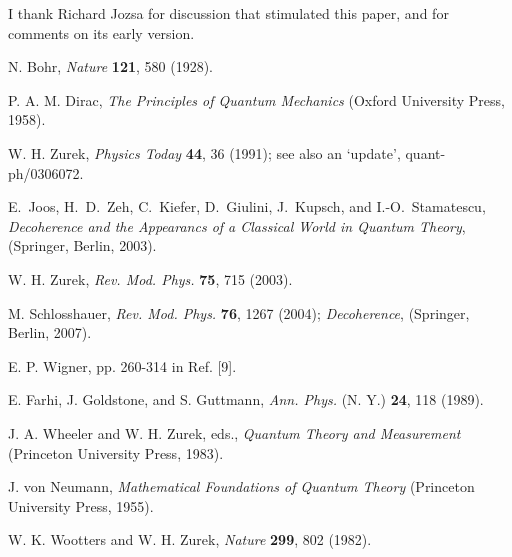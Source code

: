 \documentclass[aps,twocolumn,pra,onecolumn,12pt]{revtex4}
\newcommand{\+}         {\dagger}
\newcommand\hocom[1]{}%
\begin{document}
\hocom{Same ``indecision'' is true in quantum phase transitions. There, only broken symmetry states are 
in evidence, and detection of their symmetric superposition is all but impossible when a large number
of subsystems is involved: Only a global measurement on all microscopic subsystems could reveal 
the phase between the two obvious alternatives in the case of quantum Ising. By the same token, 
only global measurements of the whole environment can exhibit coherence between branches 
defined by redundant imprinting of information in quantum Darwinism. We have signaled some of 
the analogies that arise, but investigating them in detail is beyond the scope of this paper. }

I thank Richard Jozsa for discussion that stimulated this paper, and for
comments on its early version.

\smallskip


\smallskip

\noindent [1] N. Bohr, {\it Nature} {\bf 121}, 580 (1928).

\noindent [2] P. A. M. Dirac, {\it The Principles of Quantum Mechanics} (Oxford University Press, 1958).

\noindent [3] W. H. Zurek, {\it Physics Today} {\bf 44}, 36 (1991); see also
an `update', quant-ph/0306072.

\noindent [4] E.~Joos, H.~D.~Zeh, C.~Kiefer, D.~Giulini, J.~Kupsch, and 
I.-O.~Stamatescu, {\it Decoherence and the Appearancs of 
a Classical World in Quantum Theory}, (Springer, Berlin, 2003).

\noindent [5] W. H. Zurek, {\it Rev. Mod. Phys.} {\bf 75}, 715 (2003).

\noindent [6] M. Schlosshauer, {\it Rev. Mod. Phys.} {\bf 76}, 1267 (2004); {\it Decoherence}, 
(Springer, Berlin, 2007).

\noindent [7] E. P. Wigner, pp. 260-314 in Ref. [9].

\noindent [8] E. Farhi, J. Goldstone, and S. Guttmann, {\it Ann. Phys.} (N. Y.) {\bf 24}, 118 (1989).

\noindent [9] J. A. Wheeler and W. H. Zurek, eds., {\it Quantum Theory and
Measurement} (Princeton University Press, 1983).

\noindent [10] J. von Neumann, {\it Mathematical Foundations of Quantum Theory} (Princeton University Press, 1955).

\noindent [11] W. K. Wootters and W. H. Zurek, {\it Nature} {\bf 299}, 802 (1982).
\end{document}
